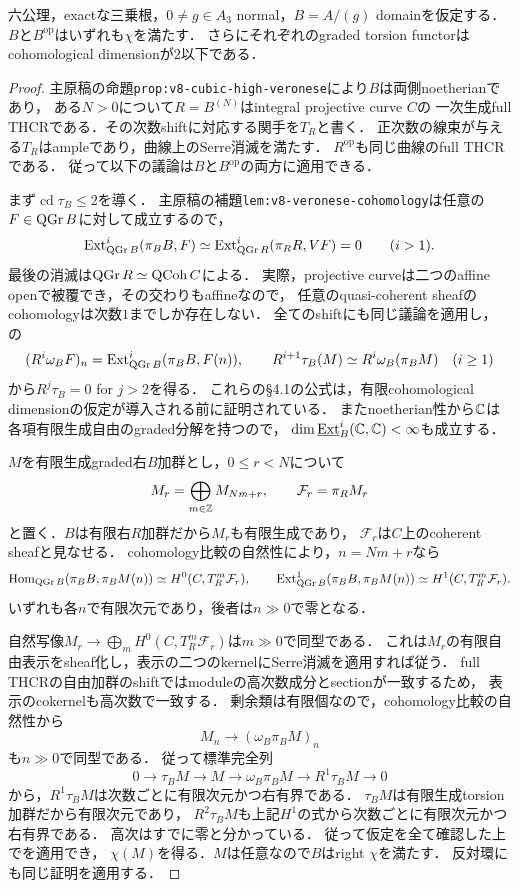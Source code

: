 \documentclass[11pt,a4paper]{ltjsarticle}
\begin{document}
\begin{proposition}
\label{prop:v8-boundary-full-chi}
六公理，exactな三乗根，$0\ne g\in A_3$ normal，$B=A/(g)$ domainを仮定する．
$B$と$B^{\mathrm{op}}$はいずれも$\chi$を満たす．
さらにそれぞれのgraded torsion functorはcohomological dimensionが$2$以下である．
\end{proposition}
\begin{proof}
主原稿の命題\texttt{prop:v8-cubic-high-veronese}により$B$は両側noetherianであり，
ある$N>0$について$R=B^{(N)}$はintegral projective curve $C$の
一次生成full THCRである．その次数shiftに対応する関手を$T_R$と書く．
正次数の線束が与える$T_R$はampleであり，曲線上のSerre消滅を満たす．
$R^{\mathrm{op}}$も同じ曲線のfull THCRである．
従って以下の議論は$B$と$B^{\mathrm{op}}$の両方に適用できる．

まず$\operatorname{cd}\tau_B\le2$を導く．
主原稿の補題\texttt{lem:v8-veronese-cohomology}は任意の$F\in\operatorname{QGr} B$に対して成立するので，
\[
 \operatorname{Ext}^i_{\operatorname{QGr} B}(\pi_BB,F)
 \simeq \operatorname{Ext}^i_{\operatorname{QGr} R}(\pi_RR,VF)=0\qquad(i>1).
\]
最後の消滅は$\operatorname{QGr} R\simeq\operatorname{QCoh}C$による．
実際，projective curveは二つのaffine openで被覆でき，その交わりもaffineなので，
任意のquasi-coherent sheafのcohomologyは次数$1$までしか存在しない．
全てのshiftにも同じ議論を適用し，
\cite[\S4.1, (4.1), Lemmas 4.1.5--4.1.6]{BvdBGenerators}の
\[
 (R^i\omega_BF)_n=\operatorname{Ext}^i_{\operatorname{QGr} B}(\pi_BB,F(n)),\qquad
 R^{i+1}\tau_B(M)\simeq R^i\omega_B(\pi_BM)\quad(i\ge1)
\]
から$R^j\tau_B=0$ for $j>2$を得る．
これらの\S4.1の公式は，有限cohomological dimensionの仮定が導入される前に証明されている．
またnoetherian性から$\mathbb C$は各項有限生成自由のgraded分解を持つので，
$\dim\underline{\operatorname{Ext}}_B^i(\mathbb C,\mathbb C)<\infty$も成立する．

$M$を有限生成graded右$B$加群とし，$0\le r<N$について
\[
 M_r=\bigoplus_{m\in\mathbb Z}M_{Nm+r},\qquad
 \mathcal F_r=\pi_RM_r
\]
と置く．$B$は有限右$R$加群だから$M_r$も有限生成であり，
$\mathcal F_r$は$C$上のcoherent sheafと見なせる．
cohomology比較の自然性により，$n=Nm+r$なら
\[
 \operatorname{Hom}_{\operatorname{QGr} B}(\pi_BB,\pi_BM(n))
 \simeq H^0(C,T_R^m\mathcal F_r),\qquad
 \operatorname{Ext}^1_{\operatorname{QGr} B}(\pi_BB,\pi_BM(n))
 \simeq H^1(C,T_R^m\mathcal F_r).
\]
いずれも各$n$で有限次元であり，後者は$n\gg0$で零となる．

自然写像$M_r\to\bigoplus_mH^0(C,T_R^m\mathcal F_r)$は$m\gg0$で同型である．
これは$M_r$の有限自由表示をsheaf化し，表示の二つのkernelにSerre消滅を適用すれば従う．
full THCRの自由加群のshiftではmoduleの高次数成分とsectionが一致するため，
表示のcokernelも高次数で一致する．
剰余類は有限個なので，cohomology比較の自然性から
\[
 M_n\longrightarrow (\omega_B\pi_BM)_n
\]
も$n\gg0$で同型である．
従って標準完全列
\[
 0\longrightarrow\tau_BM\longrightarrow M
 \longrightarrow\omega_B\pi_BM
 \longrightarrow R^1\tau_BM\longrightarrow0
\]
から，$R^1\tau_BM$は次数ごとに有限次元かつ右有界である．
$\tau_BM$は有限生成torsion加群だから有限次元であり，
$R^2\tau_BM$も上記$H^1$の式から次数ごとに有限次元かつ右有界である．
高次はすでに零と分かっている．
従って仮定を全て確認した上で\cite[Lemma 4.2.1]{BvdBGenerators}を適用でき，
$\chi(M)$を得る．$M$は任意なので$B$はright $\chi$を満たす．
反対環にも同じ証明を適用する．
\end{proof}
\end{document}
